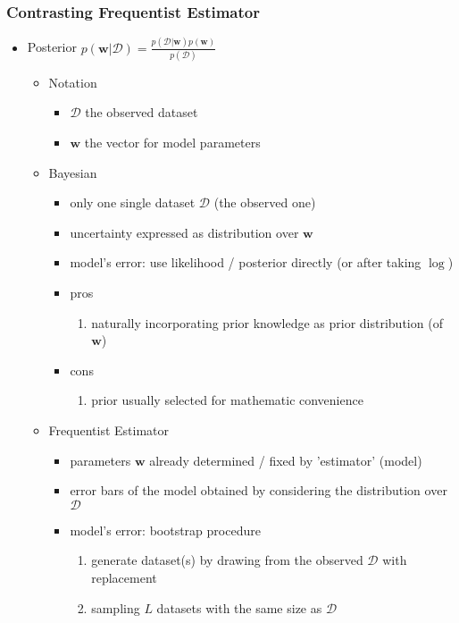 \subsubsection{Contrasting Frequentist Estimator}
\begin{itemize}
\item Posterior $\displaystyle p(\mathbf w|\mathcal D) = \frac {p(\mathcal D|\mathbf w)p(\mathbf w)}{p(\mathcal D)}$
	\begin{itemize}
	\item Notation
 		\begin{itemize}
 		\item $\mathcal D$ the observed dataset
 		\item $\mathbf w$ the vector for model parameters
 		\end{itemize}
	\item Bayesian
		\begin{itemize}
		\item only one single dataset $\mathcal D$ (the observed one)
 		\item uncertainty expressed as distribution over $\mathbf w$
 		\item model's error: use likelihood / posterior directly (or after taking $\log$)
 		\item pros
 			\begin{enumerate}
 			\item naturally incorporating prior knowledge as prior distribution (of $\mathbf w$)
 			\end{enumerate}
 		\item cons
 			\begin{enumerate}
 			\item prior usually selected for mathematic convenience 
 			\end{enumerate}
 		\end{itemize}
 	\item Frequentist Estimator
 		\begin{itemize}
 		\item parameters $\mathbf w$ already determined / fixed by 'estimator' (model)
 		\item error bars of the model obtained by considering the distribution over $\mathcal D$
 		\item model's error: bootstrap procedure
 			\begin{enumerate}
 			\item generate dataset(s) by drawing from the observed $\mathcal D$ with replacement
 			\item sampling $L$ datasets with the same size as $\mathcal D$

\end{enumerate}
\end{itemize}
\end{itemize}
\end{itemize}
